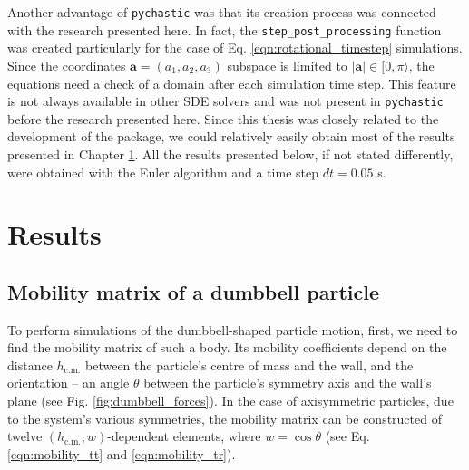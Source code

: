 \documentclass{master_thesis}
\def\code#1{\texttt{#1}}
\begin{document}
Another advantage of \code{pychastic} was that its creation process was connected with the research presented here. In fact, the \code{step\_post\_processing} function was created particularly for the case of Eq. \eqref{eqn:rotational_timestep} simulations. Since the coordinates $\boldsymbol{a} = (a_1,a_2,a_3)$ subspace is limited to $|\boldsymbol{a}|\in [0,\pi \rangle$, the equations need a check of a domain after each simulation time step. This feature is not always available in other SDE solvers and was not present in \code{pychastic} before the research presented here. Since this thesis was closely related to the development of the package, we could relatively easily obtain most of the results presented in Chapter \ref{chapter:results}. All the results presented below, if not stated differently, were obtained with the Euler algorithm and a time step $dt = 0.05$ s.

\chapter{Results} \label{chapter:results}

\section{Mobility matrix of a dumbbell particle} \label{sec:mobility_results}
To perform simulations of the dumbbell-shaped particle motion, first, we need to find the mobility matrix of such a body. Its mobility coefficients depend on the distance $h_{\textrm{c.m.}}$ between the particle's centre of mass and the wall, and the orientation -- an angle $\theta$ between the particle's symmetry axis and the wall's plane (see Fig. \ref{fig:dumbbell_forces}). In the case of axisymmetric particles, due to the system's various symmetries, the mobility matrix can be constructed of twelve $(h_{\textrm{c.m.}}, w)$-dependent elements, where $w=\cos\theta$ (see Eq. \eqref{eqn:mobility_tt} and \eqref{eqn:mobility_tr}).
\end{document}
